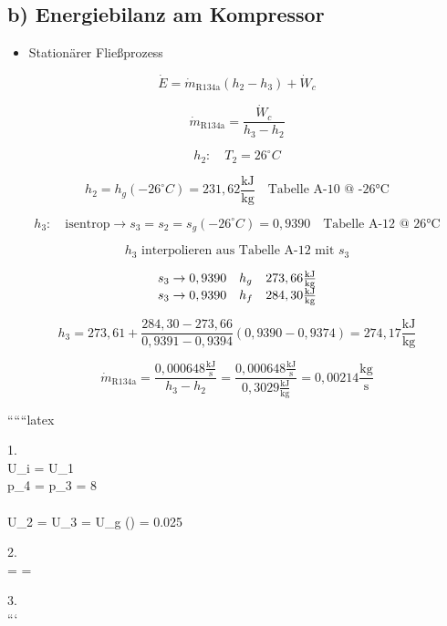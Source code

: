 \subsection*{b) Energiebilanz am Kompressor}

\begin{itemize}
    \item Stationärer Fließprozess
\end{itemize}

\[
\dot{E} = \dot{m}_{\text{R134a}} (h_2 - h_3) + \dot{W}_c
\]

\[
\dot{m}_{\text{R134a}} = \frac{\dot{W}_c}{h_3 - h_2}
\]

\[
h_2: \quad T_2 = 26^\circ C
\]

\[
h_2 = h_g(-26^\circ C) = 231,62 \frac{\text{kJ}}{\text{kg}} \quad \text{Tabelle A-10 @ -26°C}
\]

\[
h_3: \quad \text{isentrop} \rightarrow s_3 = s_2 = s_g(-26^\circ C) = 0,9390 \quad \text{Tabelle A-12 @ 26°C}
\]

\[
h_3 \text{ interpolieren aus Tabelle A-12 mit } s_3
\]

\[
\begin{array}{l l l}
s_3 \rightarrow 0,9390 & h_g & 273,66 \frac{\text{kJ}}{\text{kg}} \\
s_3 \rightarrow 0,9390 & h_f & 284,30 \frac{\text{kJ}}{\text{kg}} \\
\end{array}
\]

\[
h_3 = 273,61 + \frac{284,30 - 273,66}{0,9391 - 0,9394} (0,9390 - 0,9374) = 274,17 \frac{\text{kJ}}{\text{kg}}
\]

\[
\dot{m}_{\text{R134a}} = \frac{0,000648 \frac{\text{kJ}}{\text{s}}}{h_3 - h_2} = \frac{0,000648 \frac{\text{kJ}}{\text{s}}}{0,3029 \frac{\text{kJ}}{\text{kg}}} = 0,00214 \frac{\text{kg}}{\text{s}}
\]

``````latex


1. \\
 \Rightarrow U_i = U_1 \\
 \Rightarrow p_4 = p_3 = 8  \\
 \\
\Rightarrow U_2 = U_3 = U_g () = 0.025  \\
\Rightarrow

\begin{figure}[h]
\centering
{}
\end{figure}

2. \\
 =  = 

3. \\
```